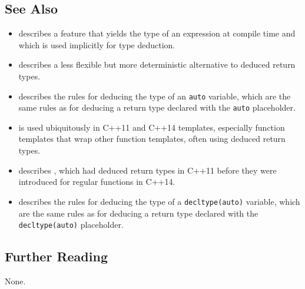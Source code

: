 \subsection[See Also]{See Also}\label{see-also}

\begin{itemize}
\item{describes a feature that yields the type of an expression at compile time and which is used implicitly for type deduction.}
%
\item{describes a less flexible but more deterministic alternative to deduced return types.}
%
\item{describes the rules for deducing the type of an \lstinline!auto! variable, which are the same rules as for deducing a return type declared with the \lstinline!auto! placeholder.}
%
\item{is used ubiquitously in C++11 and C++14 templates, especially function templates that wrap other function templates, often using deduced return types.}
%
\item{describes , which had deduced return types in C++11 before they were introduced for regular functions in C++14.}
%
\item{describes the rules for deducing the type of a \lstinline!decltype(auto)! variable, which are the same rules as for deducing a return type declared with the \lstinline!decltype(auto)! placeholder.}
\end{itemize}

\subsection[Further Reading]{Further Reading}\label{further-reading}

None.


